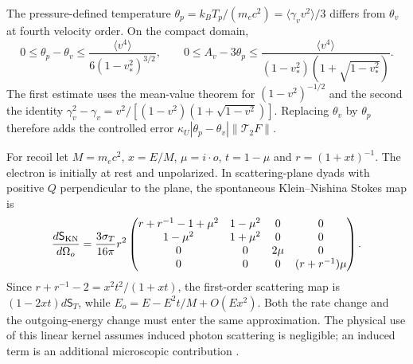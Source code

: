 The pressure-defined temperature $\theta_p=k_BT_p/(m_ec^2)=\langle\gamma_vv^2\rangle/3$ differs from $\theta_v$ at fourth velocity order. On the compact domain,
\begin{equation}
 0\le\theta_p-\theta_v\le\frac{\langle v^4\rangle}{6(1-v_*^2)^{3/2}},\qquad
 0\le A_v-3\theta_p\le
 \frac{\langle v^4\rangle}{(1-v_*^2)(1+\sqrt{1-v_*^2})}.
 \label{ii:temperature_parameter_error}
\end{equation}
The first estimate uses the mean-value theorem for $(1-v^2)^{-1/2}$ and the second the identity $\gamma_v^2-\gamma_v=v^2/[(1-v^2)(1+\sqrt{1-v^2})]$. Replacing $\theta_v$ by $\theta_p$ therefore adds the controlled error $\kappa_U|\theta_p-\theta_v|\|\mathscr T_2F\|$.


For recoil let $M=m_ec^2$, $x=E/M$, $\mu=i\cdot o$, $t=1-\mu$ and $r=(1+xt)^{-1}$. The electron is initially at rest and unpolarized. In scattering-plane dyads with positive $Q$ perpendicular to the plane, the spontaneous Klein--Nishina Stokes map is
\begin{equation}
 \frac{d\mathsf S_{\rm KN}}{d\Omega_o}
 =\frac{3\sigma_T}{16\pi}r^2
 \begin{pmatrix}
 r+r^{-1}-1+\mu^2&1-\mu^2&0&0\\
 1-\mu^2&1+\mu^2&0&0\\
 0&0&2\mu&0\\
 0&0&0&(r+r^{-1})\mu
 \end{pmatrix}.
 \label{ii:KN_matrix}
\end{equation}
Since $r+r^{-1}-2=x^2t^2/(1+xt)$, the first-order scattering map is $(1-2xt)d\mathsf S_T$, while $E_o=E-E^2t/M+O(Ex^2)$. Both the rate change and the outgoing-energy change must enter the same approximation. The physical use of this linear kernel assumes induced photon scattering is negligible; an induced term is an additional microscopic contribution \cite{Pitrou2021}.

